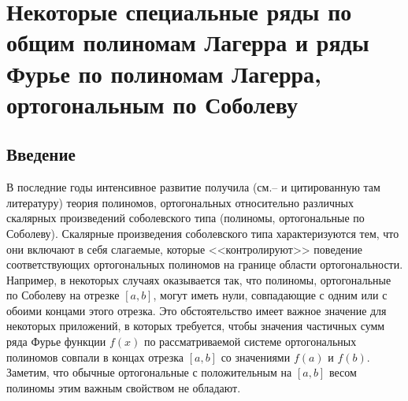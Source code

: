 \section{Некоторые специальные ряды по общим полиномам Лагерра и ряды Фурье по полиномам Лагерра, ортогональным по Соболеву }
\subsection{Введение}

В последние годы интенсивное развитие получила (см.\cite{Haar-Tcheb-KwonLittl1}--\cite{Haar-Tcheb-MarcelXu} и цитированную там литературу) теория полиномов, ортогональных относительно различных скалярных произведений соболевского типа (полиномы, ортогональные по Соболеву). Скалярные произведения соболевского типа характеризуются тем, что они включают в себя слагаемые, которые <<контролируют>> поведение соответствующих ортогональных полиномов на границе области ортогональности. Например, в некоторых случаях оказывается так, что полиномы, ортогональные по Соболеву на отрезке $[a,b]$, могут иметь нули, совпадающие с одним или с обоими концами этого отрезка. Это обстоятельство имеет важное значение для некоторых приложений, в которых требуется, чтобы значения  частичных сумм ряда Фурье функции $f(x)$ по рассматриваемой системе ортогональных полиномов совпали в концах отрезка $[a,b]$ со значениями $f(a)$ и $f(b)$. Заметим, что обычные ортогональные с положительным на  $[a,b]$ весом полиномы этим важным свойством не обладают.

